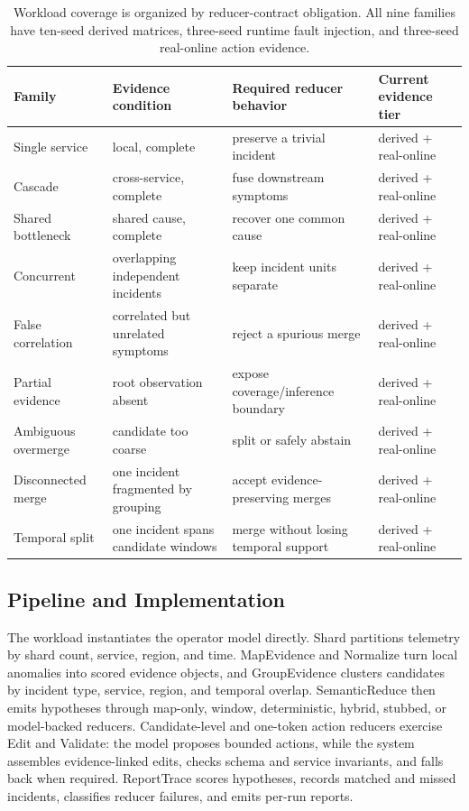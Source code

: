\documentclass[sigplan,anonymous,nonacm]{acmart}
\begin{document}
\begin{table}[t]
\caption{Workload coverage is organized by reducer-contract obligation. All nine families have ten-seed derived matrices, three-seed runtime fault injection, and three-seed real-online action evidence.}
\label{tab:workload-contract-coverage}
\centering
\normalsize
\begin{tabular}{@{}>{\raggedright\arraybackslash}p{}>{\raggedright\arraybackslash}p{}>{\raggedright\arraybackslash}p{}>{\raggedright\arraybackslash}p{}@{}}
\toprule
Family & Evidence condition & Required reducer behavior & Current evidence tier \\
\midrule
Single service & local, complete & preserve a trivial incident & derived + real-online \\
Cascade & cross-service, complete & fuse downstream symptoms & derived + real-online \\
Shared bottleneck & shared cause, complete & recover one common cause & derived + real-online \\
Concurrent & overlapping independent incidents & keep incident units separate & derived + real-online \\
False correlation & correlated but unrelated symptoms & reject a spurious merge & derived + real-online \\
Partial evidence & root observation absent & expose coverage/inference boundary & derived + real-online \\
Ambiguous overmerge & candidate too coarse & split or safely abstain & derived + real-online \\
Disconnected merge & one incident fragmented by grouping & accept evidence-preserving merges & derived + real-online \\
Temporal split & one incident spans candidate windows & merge without losing temporal support & derived + real-online \\
\bottomrule
\end{tabular}
\end{table}

\subsection{Pipeline and Implementation}

The workload instantiates the operator model directly. \textsf{Shard} partitions telemetry by shard count, service, region, and time. \textsf{MapEvidence} and \textsf{Normalize} turn local anomalies into scored evidence objects, and \textsf{GroupEvidence} clusters candidates by incident type, service, region, and temporal overlap. \textsf{SemanticReduce} then emits hypotheses through map-only, window, deterministic, hybrid, stubbed, or model-backed reducers. Candidate-level and one-token action reducers exercise \textsf{Edit} and \textsf{Validate}: the model proposes bounded actions, while the system assembles evidence-linked edits, checks schema and service invariants, and falls back when required. \textsf{ReportTrace} scores hypotheses, records matched and missed incidents, classifies reducer failures, and emits per-run reports.
\end{document}
